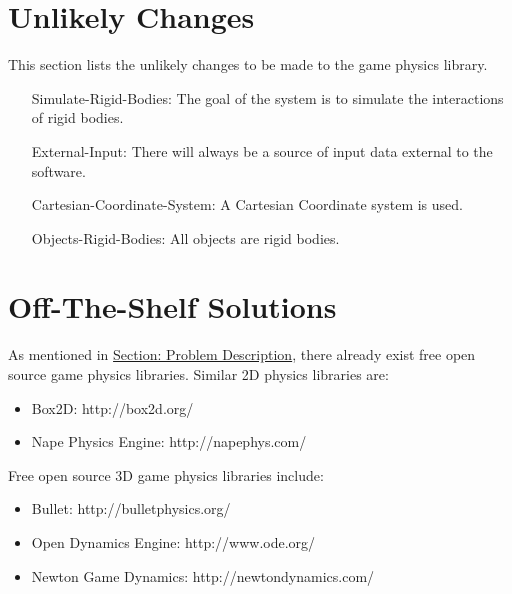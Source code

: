 \documentclass[12pt]{article}
\begin{document}
\section{Unlikely Changes}
\label{Sec:UCs}
This section lists the unlikely changes to be made to the game physics library.
\begin{itemize}
\item[Simulate-Rigid-Bodies:\phantomsection\label{ucSRB}]The goal of the system is to simulate the interactions of rigid bodies.
\item[External-Input:\phantomsection\label{ucEI}]There will always be a source of input data external to the software.
\item[Cartesian-Coordinate-System:\phantomsection\label{ucCCS}]A Cartesian Coordinate system is used.
\item[Objects-Rigid-Bodies:\phantomsection\label{ucORB}]All objects are rigid bodies.
\end{itemize}
\section{Off-The-Shelf Solutions}
\label{Sec:ExistingSolns}
As mentioned in \hyperref[Sec:ProbDesc]{Section: Problem Description}, there already exist free open source game physics libraries. Similar 2D physics libraries are:
\begin{itemize}
\item{Box2D: http://box2d.org/}
\item{Nape Physics Engine: http://napephys.com/}
\end{itemize}
Free open source 3D game physics libraries include:
\begin{itemize}
\item{Bullet: http://bulletphysics.org/}
\item{Open Dynamics Engine: http://www.ode.org/}
\item{Newton Game Dynamics: http://newtondynamics.com/}
\end{itemize}
\end{document}
